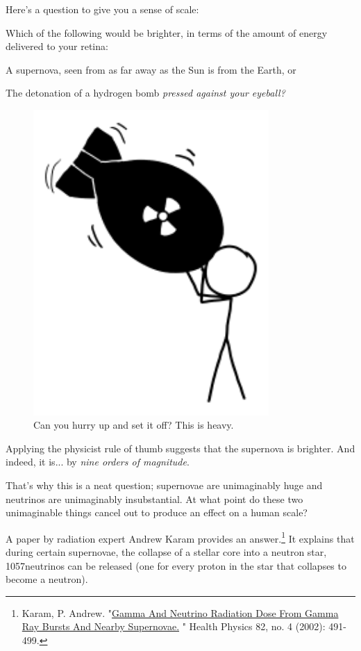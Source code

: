 {{Here's a question to give you a sense of scale:}

{Which of the following would be brighter, in terms of the amount of energy delivered to your retina:}

{A supernova, seen from as far away as the Sun is from the Earth, or}

{The detonation of a hydrogen bomb \emph{pressed against your eyeball?} }

\begin{figure}[!htbp]
\centering
\includegraphics[scale=0.5, max width=0.8\textwidth]{imgs/a/73/neutrinos_bomb.png}
\caption{Can you hurry up and set it off? This is heavy.}
\end{figure}

{Applying the physicist rule of thumb suggests that the supernova is brighter. And indeed, it is... by \emph{nine orders of magnitude}.}

{That's why this is a neat question; supernovae are unimaginably huge and neutrinos are unimaginably insubstantial. At what point do these two unimaginable things cancel out to produce an effect on a human scale?}

{A paper by radiation expert Andrew Karam provides an answer.{\footnote{Karam, P. Andrew. "\href{http://wayback.archive.org/web/20120313045458/http://www.andrewkaram.com/andy/pdf/HPJ.pdf}{Gamma And Neutrino Radiation Dose From Gamma Ray Bursts And Nearby Supernovae.} " Health Physics 82, no. 4 (2002): 491-499.} } It explains that during certain supernovae, the collapse of a stellar core into a neutron star, 1057neutrinos can be released (one for every proton in the star that collapses to become a neutron).}

}
